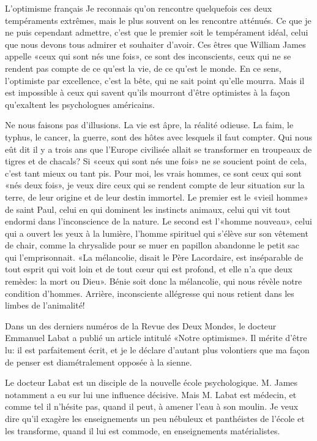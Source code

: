 \begin{chapter}{L'optimisme français}
Je reconnais qu'on rencontre quelquefois ces deux tempéraments extrêmes,
mais le plus souvent on les rencontre atténués. Ce que je ne puis
cependant admettre, c'est que le premier soit le tempérament idéal,
celui que nous devons tous admirer et souhaiter d'avoir. Ces êtres que
William James appelle «ceux qui sont nés une fois», ce sont des
inconscients, ceux qui ne se rendent pas compte de ce qu'est la vie, de
ce qu'est le monde. En ce sens, l'optimiste par excellence, c'est la
bête, qui ne sait point qu'elle mourra. Mais il est impossible à ceux
qui savent qu'ils mourront d'être optimistes à la façon qu'exaltent les
psychologues américains.

Ne nous faisons pas d'illusions. La vie est âpre, la réalité odieuse. La
faim, le typhus, le cancer, la guerre, sont des hôtes avec lesquels il
faut compter. Qui nous eût dit il y a trois ans que l'Europe civilisée
allait se transformer en troupeaux de tigres et de chacals? Si «ceux qui
sont nés une fois» ne se soucient point de cela, c'est tant mieux ou
tant pis. Pour moi, les vrais hommes, ce sont ceux qui sont «nés deux
fois», je veux dire ceux qui se rendent compte de leur situation sur la
terre, de leur origine et de leur destin immortel. Le premier est le
«vieil homme» de saint Paul, celui en qui dominent les instincts
animaux, celui qui vit tout endormi dans l'inconscience de la nature. Le
second est l'«homme nouveau», celui qui a ouvert les yeux à la lumière,
l'homme spirituel qui s'élève sur son vêtement de chair, comme la
chrysalide pour se muer en papillon abandonne le petit sac qui
l'emprisonnait. «La mélancolie, disait le Père Lacordaire, est
inséparable de tout esprit qui voit loin et de tout cœur qui est
profond, et elle n'a que deux remèdes: la mort ou Dieu». Bénie soit donc
la mélancolie, qui nous révèle notre condition d'hommes. Arrière,
inconsciente allégresse qui nous retient dans les limbes de l'animalité!

\horizontalLine

Dans un des derniers numéros de la Revue des Deux Mondes, le docteur
Emmanuel Labat a publié un article intitulé «Notre optimisme». Il mérite
d'être lu: il est parfaitement écrit, et je le déclare d'autant plus
volontiers que ma façon de penser est diamétralement opposée à la
sienne.

Le docteur Labat est un disciple de la nouvelle école psychologique. M.
James notamment a eu sur lui une influence décisive. Mais M. Labat est
médecin, et comme tel il n'hésite pas, quand il peut, à amener l'eau à
son moulin. Je veux dire qu'il exagère les enseignements un peu nébuleux
et panthéistes de l'école et les transforme, quand il lui est commode,
en enseignements matérialistes.


\end{chapter}
